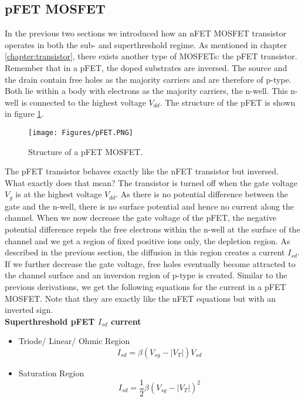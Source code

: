 \subsection{pFET MOSFET}

In the previous two sections we introduced how an nFET MOSFET transistor operates in both the sub- and superthreshold regime. As mentioned in chapter \ref{chapter:transistor}, there exists another type of MOSFETs: the pFET transistor. Remember that in a pFET, the doped substrates are inversed. The source and the drain contain free holes as the majority carriers and are therefore of p-type. Both lie within a body with electrons as the majority carriers, the n-well. This n-well is connected to the highest voltage $V_{dd}$. The structure of the pFET is shown in figure \ref{fig:pfet}.\\

\begin{figure}
    \centering
    \texttt{[image: Figures/pFET.PNG]}
    \caption{Structure of a pFET MOSFET.}
    \label{fig:pfet}
\end{figure}

The pFET transistor behaves exactly like the nFET transistor but inversed. What exactly does that mean? The transistor is turned off when the gate voltage $V_g$ is at the highest voltage $V_{dd}$. As there is no potential difference between the gate and the n-well, there is no surface potential and hence no current along the channel. When we now decrease the gate voltage of the pFET, the negative potential difference repels the free electrons within the n-well at the surface of the channel and we get a region of fixed positive ions only, the depletion region. As described in the previous section, the diffusion in this region creates a current $I_{sd}$. If we further decrease the gate voltage, free holes eventually become attracted to the channel surface and an inversion region of p-type is created. Similar to the previous derivations, we get the following equations for the current in a pFET MOSFET. Note that they are exactly like the nFET equations but with an inverted sign.\\

\textbf{Superthreshold pFET $I_{sd}$ current}
\begin{itemize}
    \item Triode/ Linear/ Ohmic Region
    \begin{equation}
        I_{sd} = \beta (V_{sg} - |V_T|) V_{sd}
    \end{equation}
    \item Saturation Region
    \begin{equation}
        I_{sd} = \frac{1}{2} \beta (V_{sg} - |V_T|)^2
    \end{equation}
\end{itemize}

